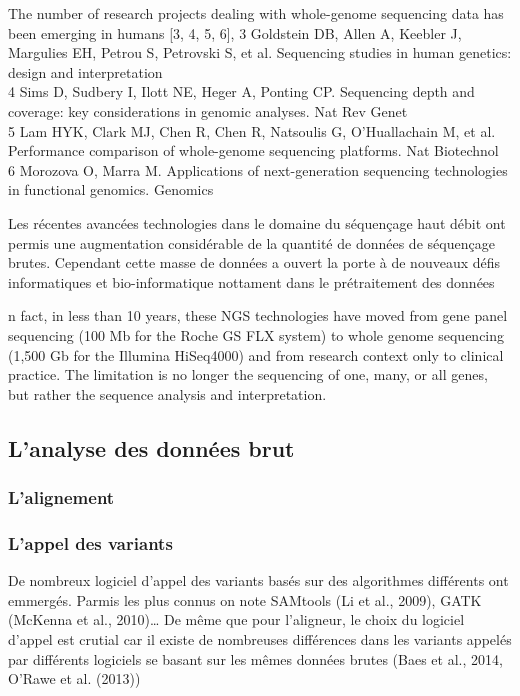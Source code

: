 \documentclass[12pt,twoside]{reedthesis}
\theoremstyle{definition}
\theoremstyle{definition}
\theoremstyle{remark}
\begin{document}
  The number of research projects dealing with whole-genome sequencing
  data has been emerging in humans {[}3, 4, 5, 6{]}, 3 Goldstein DB, Allen
  A, Keebler J, Margulies EH, Petrou S, Petrovski S, et al. Sequencing
  studies in human genetics: design and interpretation\\
  4 Sims D, Sudbery I, Ilott NE, Heger A, Ponting CP. Sequencing depth and
  coverage: key considerations in genomic analyses. Nat Rev Genet\\
  5 Lam HYK, Clark MJ, Chen R, Chen R, Natsoulis G, O'Huallachain M, et
  al. Performance comparison of whole-genome sequencing platforms. Nat
  Biotechnol\\
  6 Morozova O, Marra M. Applications of next-generation sequencing
  technologies in functional genomics. Genomics
  
  Les récentes avancées technologies dans le domaine du séquençage haut
  débit ont permis une augmentation considérable de la quantité de données
  de séquençage brutes. Cependant cette masse de données a ouvert la porte
  à de nouveaux défis informatiques et bio-informatique nottament dans le
  prétraitement des données
  
  n fact, in less than 10 years, these NGS technologies have moved from
  gene panel sequencing (100 Mb for the Roche GS FLX system) to whole
  genome sequencing (1,500 Gb for the Illumina HiSeq4000) and from
  research context only to clinical practice. The limitation is no longer
  the sequencing of one, many, or all genes, but rather the sequence
  analysis and interpretation.
  
  \subsection{L'analyse des données brut}\label{lanalyse-des-donnees-brut}
  
  \subsubsection{L'alignement}\label{lalignement}
  
  \subsubsection{L'appel des variants}\label{lappel-des-variants}
  
  De nombreux logiciel d'appel des variants basés sur des algorithmes
  différents ont emmergés. Parmis les plus connus on note SAMtools (Li et
  al., 2009), GATK (McKenna et al., 2010)\ldots{} De même que pour
  l'aligneur, le choix du logiciel d'appel est crutial car il existe de
  nombreuses différences dans les variants appelés par différents
  logiciels se basant sur les mêmes données brutes (Baes et al., 2014,
  O'Rawe et al. (2013))
  
\end{document}
